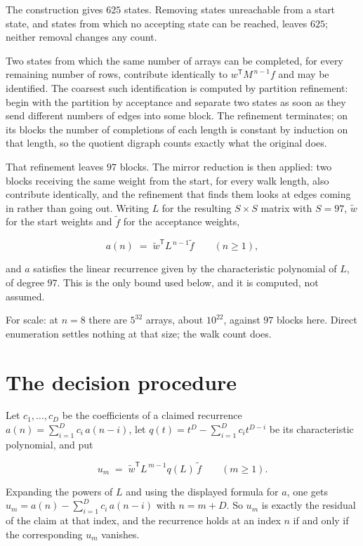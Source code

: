 \documentclass[11pt]{article}
\theoremstyle{definition}
\begin{document}
The construction gives $625$ states. Removing states unreachable from a start state, and states from which no accepting state can be reached, leaves $625$; neither removal changes any count.

Two states from which the same number of arrays can be completed, for every remaining number of rows, contribute identically to $w^{\mathsf T}M^{\,n-1}f$ and may be identified. The coarsest such identification is computed by partition refinement: begin with the partition by acceptance and separate two states as soon as they send different numbers of edges into some block. The refinement terminates; on its blocks the number of completions of each length is constant by induction on that length, so the quotient digraph counts exactly what the original does.

That refinement leaves $97$ blocks. The mirror reduction is then applied: two blocks receiving the same weight from the start, for every walk length, also contribute identically, and the refinement that finds them looks at edges coming in rather than going out. Writing $L$ for the resulting $S \times S$ matrix with $S = 97$, $\tilde w$ for the start weights and $\tilde f$ for the acceptance weights,

\[a(n) \;=\; \tilde w^{\mathsf T} L^{\,n-1} \tilde f \qquad (n \ge 1),\]

and $a$ satisfies the linear recurrence given by the characteristic polynomial of $L$, of degree $97$. This is the only bound used below, and it is computed, not assumed.

For scale: at $n = 8$ there are $5^{32}$ arrays, about $10^{22}$, against $97$ blocks here. Direct enumeration settles nothing at that size; the walk count does.

\section{The decision procedure}

Let $c_1,\dots,c_D$ be the coefficients of a claimed recurrence $a(n) = \sum_{i=1}^{D} c_i\,a(n-i)$, let $q(t) = t^{D} - \sum_{i=1}^{D} c_i t^{D-i}$ be its characteristic polynomial, and put

\[u_m \;=\; \tilde w^{\mathsf T} L^{\,m-1} q(L)\,\tilde f \qquad (m \ge 1).\]

Expanding the powers of $L$ and using the displayed formula for $a$, one gets $u_m = a(n) - \sum_{i=1}^{D} c_i\,a(n-i)$ with $n = m + D$. So $u_m$ is exactly the residual of the claim at that index, and the recurrence holds at an index $n$ if and only if the corresponding $u_m$ vanishes.
\end{document}
